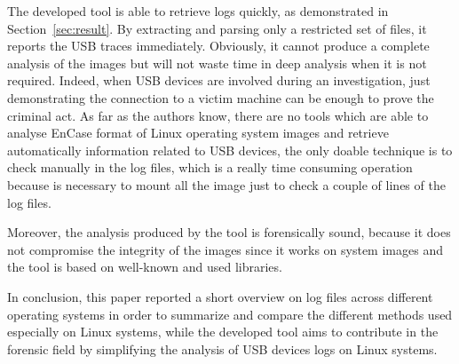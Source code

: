 \documentclass[a4paper]{article}
\begin{document}
The developed tool is able to retrieve logs quickly, as demonstrated in
Section~\ref{sec:result}. By extracting and parsing only a restricted set of
files, it reports the USB traces immediately. Obviously, it cannot produce a
complete analysis of the images but will not waste time in deep analysis when it
is not required. Indeed, when USB devices are involved during an investigation,
just demonstrating the connection to a victim machine can be enough to prove the
criminal act. As far as the authors know, there are no tools which are able to
analyse EnCase format of Linux operating system images and retrieve
automatically information related to USB devices, the only doable technique is
to check manually in the log files, which is a really time consuming operation
because is necessary to mount all the image just to check a couple of lines of
the log files.

Moreover, the analysis produced by the tool is forensically sound, because it
does not compromise the integrity of the images since it works on system
images and the tool is based on well-known and used libraries.

In conclusion, this paper reported a short overview on log files across
different operating systems in order to summarize and compare the different
methods used especially on Linux systems, while the developed tool aims to
contribute in the forensic field by simplifying the analysis of USB devices logs
on Linux systems.



\end{document}
